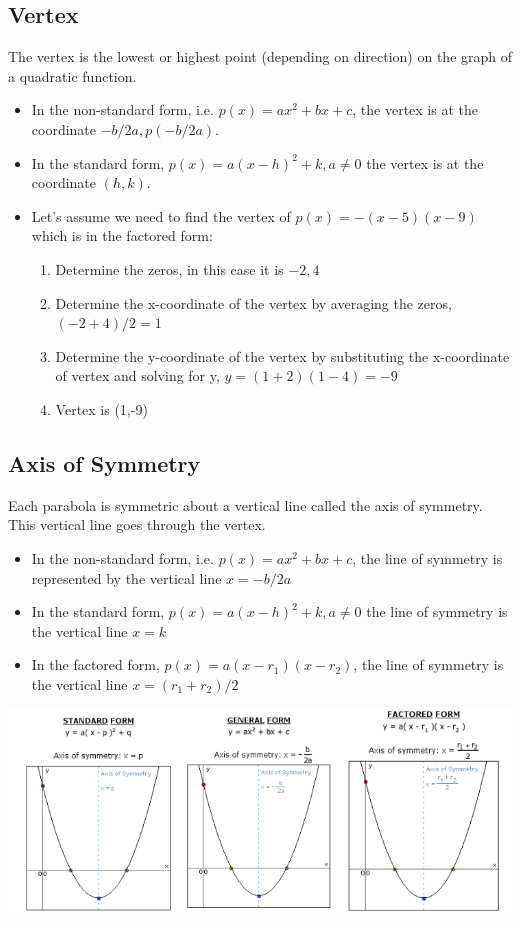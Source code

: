 \documentclass{book}
\begin{document}
	\subsection{Vertex}
	The vertex is the lowest or highest point (depending on direction) on the graph of a quadratic function.
	\begin{itemize}
		\item In the non-standard form, i.e. $p(x) = ax^2 + bx + c$, the vertex is at the coordinate $-b/2a, p(-b/2a)$.
		\item In the standard form, $p(x) = a(x-h)^2 + k, a \neq 0$ the vertex is at the coordinate $(h,k)$.
		\item Let's assume we need to find the vertex of $p(x) = -(x-5)(x-9)$ which is in the factored form:
		\begin{enumerate}
			\item Determine the zeros, in this case it is $-2,4$
			\item Determine the x-coordinate of the vertex by averaging the zeros, $(-2+4)/2 = 1$
			\item Determine the y-coordinate of the vertex by substituting the x-coordinate of vertex and solving for y, $y = (1+2)(1-4)=-9$
			\item Vertex is (1,-9)
		\end{enumerate} 
		
		
	\end{itemize}
	
	
	\subsection{Axis of Symmetry}
	Each parabola is symmetric about a vertical line called the axis of symmetry.  This vertical line goes through the vertex.
	\begin{itemize}
		\item In the non-standard form, i.e. $p(x) = ax^2 + bx + c$, the line of symmetry is represented by the vertical line $x= -b/2a$
		\item In the standard form, $p(x) = a(x-h)^2 + k, a \neq 0$ the line of symmetry is the vertical line $x = k$ 
		\item In the factored form, $p(x) = a(x-r_1)(x-r_2)$, the line of symmetry is the vertical line $x = (r_1 + r_2)/2$ 
	\end{itemize}
	
	\includegraphics[scale=0.6]{parabolalos}
	
\end{document}

